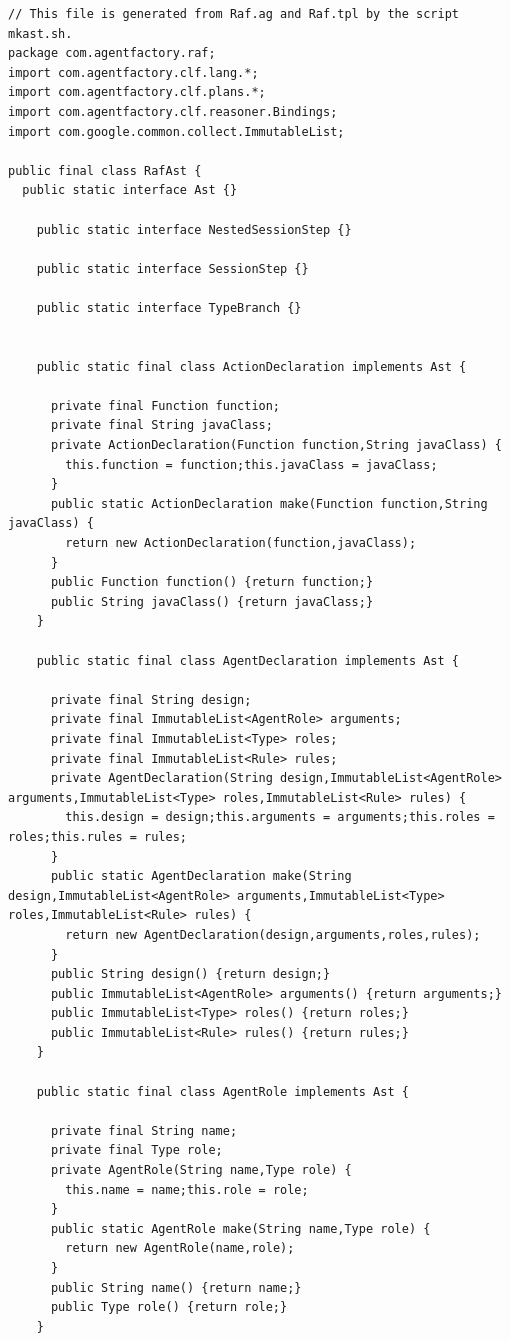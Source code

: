 \documentclass[a4paper,12pt,oneside,fleqn]{book} %
\begin{document}
{\tiny
\begin{verbatim}
// This file is generated from Raf.ag and Raf.tpl by the script mkast.sh.
package com.agentfactory.raf;
import com.agentfactory.clf.lang.*;
import com.agentfactory.clf.plans.*;
import com.agentfactory.clf.reasoner.Bindings;
import com.google.common.collect.ImmutableList;

public final class RafAst {
  public static interface Ast {}
  
    public static interface NestedSessionStep {}
  
    public static interface SessionStep {}
  
    public static interface TypeBranch {}
  
  
    public static final class ActionDeclaration implements Ast {
      
      private final Function function;
      private final String javaClass;
      private ActionDeclaration(Function function,String javaClass) {
        this.function = function;this.javaClass = javaClass;
      }
      public static ActionDeclaration make(Function function,String javaClass) {
        return new ActionDeclaration(function,javaClass);
      }
      public Function function() {return function;}
      public String javaClass() {return javaClass;}
    }
  
    public static final class AgentDeclaration implements Ast {
      
      private final String design;
      private final ImmutableList<AgentRole> arguments;
      private final ImmutableList<Type> roles;
      private final ImmutableList<Rule> rules;
      private AgentDeclaration(String design,ImmutableList<AgentRole> arguments,ImmutableList<Type> roles,ImmutableList<Rule> rules) {
        this.design = design;this.arguments = arguments;this.roles = roles;this.rules = rules;
      }
      public static AgentDeclaration make(String design,ImmutableList<AgentRole> arguments,ImmutableList<Type> roles,ImmutableList<Rule> rules) {
        return new AgentDeclaration(design,arguments,roles,rules);
      }
      public String design() {return design;}
      public ImmutableList<AgentRole> arguments() {return arguments;}
      public ImmutableList<Type> roles() {return roles;}
      public ImmutableList<Rule> rules() {return rules;}
    }
  
    public static final class AgentRole implements Ast {
      
      private final String name;
      private final Type role;
      private AgentRole(String name,Type role) {
        this.name = name;this.role = role;
      }
      public static AgentRole make(String name,Type role) {
        return new AgentRole(name,role);
      }
      public String name() {return name;}
      public Type role() {return role;}
    }
  

\end{verbatim}}
\end{document}
